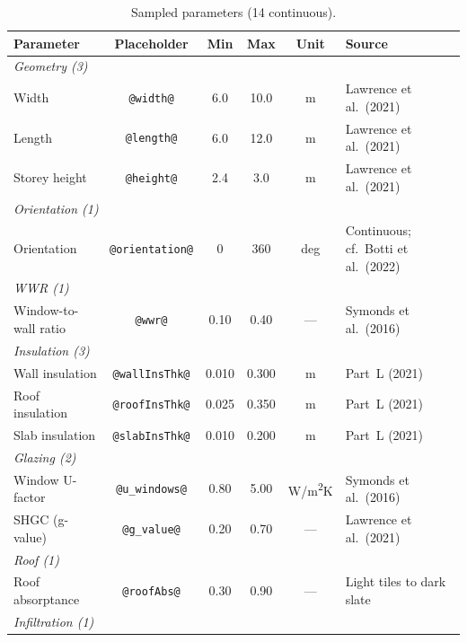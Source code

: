 \documentclass[12pt,a4paper]{report}
\begin{document}
\begin{table}[htbp]
\centering
\caption{Sampled parameters (14 continuous).}
\label{tab:parameters}
\footnotesize
\begin{tabularx}{\textwidth}{lccccX}
\toprule
\textbf{Parameter} & \textbf{Placeholder} & \textbf{Min} & \textbf{Max} & \textbf{Unit} & \textbf{Source} \\
\midrule
\multicolumn{6}{l}{\textit{Geometry (3)}} \\
Width               & \texttt{@width@}              & 6.0   & 10.0  & m       & Lawrence et al.\ (2021) \\
Length              & \texttt{@length@}             & 6.0   & 12.0  & m       & Lawrence et al.\ (2021) \\
Storey height       & \texttt{@height@}             & 2.4   & 3.0   & m       & Lawrence et al.\ (2021) \\
\midrule
\multicolumn{6}{l}{\textit{Orientation (1)}} \\
Orientation         & \texttt{@orientation@}        & 0     & 360   & deg     & Continuous; cf.\ Botti et al.\ (2022) \\
\midrule
\multicolumn{6}{l}{\textit{WWR (1)}} \\
Window-to-wall ratio & \texttt{@wwr@}               & 0.10  & 0.40  & ---     & Symonds et al.\ (2016) \\
\midrule
\multicolumn{6}{l}{\textit{Insulation (3)}} \\
Wall insulation     & \texttt{@wallInsThk@}         & 0.010 & 0.300 & m       & Part~L (2021) \\
Roof insulation     & \texttt{@roofInsThk@}         & 0.025 & 0.350 & m       & Part~L (2021) \\
Slab insulation     & \texttt{@slabInsThk@}         & 0.010 & 0.200 & m       & Part~L (2021) \\
\midrule
\multicolumn{6}{l}{\textit{Glazing (2)}} \\
Window U-factor     & \texttt{@u\_windows@}         & 0.80  & 5.00  & W/m\textsuperscript{2}K & Symonds et al.\ (2016) \\
SHGC (g-value)      & \texttt{@g\_value@}           & 0.20  & 0.70  & ---     & Lawrence et al.\ (2021) \\
\midrule
\multicolumn{6}{l}{\textit{Roof (1)}} \\
Roof absorptance    & \texttt{@roofAbs@}            & 0.30  & 0.90  & ---     & Light tiles to dark slate \\
\midrule
\multicolumn{6}{l}{\textit{Infiltration (1)}} \\

\end{tabularx}
\end{table}
\end{document}
